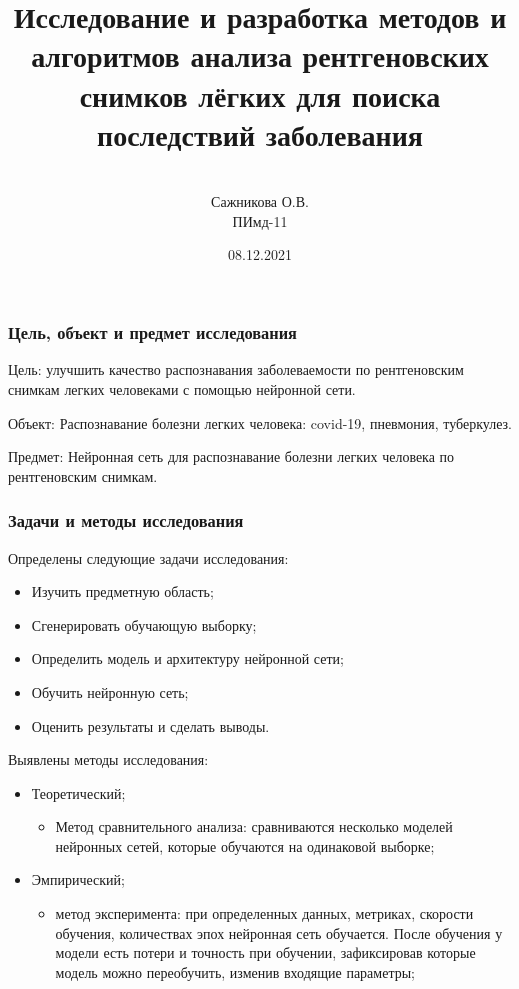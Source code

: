 \documentclass[
	fullscreen=true, 
	bookmarks=false,
	sans serif,
	9pt,
	pdf,
	hyperref={
		pdfpagelabels=false,
		unicode=true
	}
]{beamer}
\title{
	Исследование и разработка методов и алгоритмов анализа рентгеновских снимков лёгких для поиска последствий заболевания
}
\author{
	\vspace{0.5cm}\\
    Сажникова О.В.\\
	\vspace{0.1cm}
	ПИмд-11\\
	\vspace{2cm}
}
\institute{УлГТУ}
\date{08.12.2021}
\begin{document}
	
	\begin{frame}
		\titlepage
	\end{frame}	
		
	\section{}
	\subsection{}
		
	\begin{frame}\frametitle{Цель, объект и предмет исследования}
		Цель: улучшить качество распознавания заболеваемости по рентгеновским снимкам легких человеками с помощью нейронной сети.
		\newline
		
		Объект: Распознавание болезни легких человека: covid-19, пневмония, туберкулез.
		\newline
		
		Предмет: Нейронная сеть для распознавание болезни легких человека по рентгеновским снимкам.
	\end{frame}

	\begin{frame}\frametitle{Задачи и методы исследования}
	
		Определены следующие задачи исследования:
		\begin{itemize}
			\item Изучить предметную область;
			\item Сгенерировать обучающую выборку;
			\item Определить модель и архитектуру нейронной сети;
			\item Обучить нейронную сеть;
			\item Оценить результаты и сделать выводы.
			\newline
		\end{itemize}
	
		\newline
		
		Выявлены методы исследования:
		\begin{itemize}
			\item Теоретический;
			    \begin{itemize}
			        \item Метод сравнительного анализа: сравниваются несколько моделей нейронных сетей, которые обучаются на одинаковой выборке;
			    \end{itemize}
			\item Эмпирический;
			    \begin{itemize}
			        \item метод эксперимента: при определенных данных, метриках, скорости обучения, количествах эпох нейронная сеть обучается. После обучения у модели есть потери и точность при обучении, зафиксировав которые модель можно переобучить, изменив входящие параметры;
			    \end{itemize}
		\end{itemize}
	\end{frame}
\end{document}

